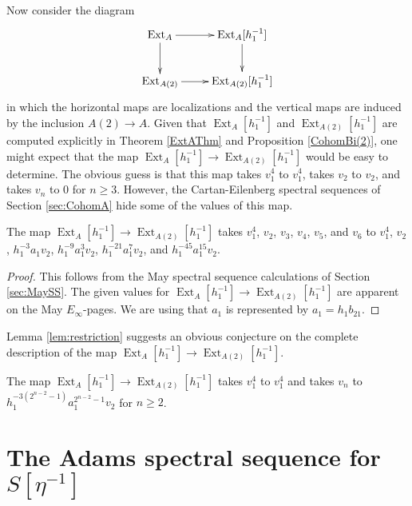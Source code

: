 \documentclass[10pt]{amsart}
\begin{document}
Now consider the diagram
\[ \xymatrix{
\operatorname{Ext}_{A} \ar[r] \ar[d] & \operatorname{Ext}_{A}[h_1^{-1}] \ar[d] \\
\operatorname{Ext}_{A(2)} \ar[r] & \operatorname{Ext}_{A(2)}[h_1^{-1}]
} \]
in which the horizontal maps are localizations and the vertical maps are
induced by the inclusion $A(2) {\longrightarrow} A$.
Given that $\operatorname{Ext}_A[h_1^{-1}]$ and $\operatorname{Ext}_{A(2)}[h_1^{-1}]$
are computed explicitly in Theorem \ref{ExtAThm} and 
Proposition \ref{CohomBi(2)}, one might expect that the map
$\operatorname{Ext}_A [h_1^{-1}] {\longrightarrow} \operatorname{Ext}_{A(2)} [h_1^{-1}]$
would be easy to determine.  
The obvious guess is that this map takes $v_1^4$ to $v_1^4$,
takes $v_2$ to $v_2$, and takes $v_n$ to $0$ for $n \geq 3$.
However, the Cartan-Eilenberg spectral
sequences of Section \ref{sec:CohomA}
hide some of the values of this map.

\begin{lemma}
\label{lem:restriction}
The map $\operatorname{Ext}_A[h_1^{-1}] {\longrightarrow} \operatorname{Ext}_{A(2)} [h_1^{-1}]$
takes $v_1^4$, $v_2$, $v_3$, $v_4$, $v_5$, and $v_6$ to
$v_1^4$, $v_2$, $h_1^{-3} a_1 v_2$, 
$h_1^{-9} a_1^3 v_2$, $h_1^{-21} a_1^7 v_2$, and
$h_1^{-45} a_1^{15} v_2$.
\end{lemma}

\begin{proof}
This follows from the May spectral sequence calculations of
Section \ref{sec:MaySS}.  
The given values for 
$\operatorname{Ext}_A[h_1^{-1}] {\longrightarrow} \operatorname{Ext}_{A(2)} [h_1^{-1}]$ are
apparent on the May $E_\infty$-pages.
We are using that $a_1$ is represented by $a_1=h_1b_{21}$.
\end{proof}

Lemma \ref{lem:restriction} suggests an obvious conjecture 
on the complete description of the map
$\operatorname{Ext}_A [h_1^{-1}] {\longrightarrow} \operatorname{Ext}_{A(2)} [h_1^{-1}]$.

\begin{conj}\label{conj:restriction} The map 
$\operatorname{Ext}_A [h_1^{-1}] {\longrightarrow} \operatorname{Ext}_{A(2)} [h_1^{-1}]$
takes $v_1^4$ to $v_1^4$ and takes
$v_n$ to $h_1^{-3(2^{n-2}-1)} a_1^{2^{n-2} - 1} v_2$ for $n \geq 2$.
\end{conj}

\section{The Adams spectral sequence for $S[\eta^{-1}]$}\label{sec:ASS}
\end{document}
